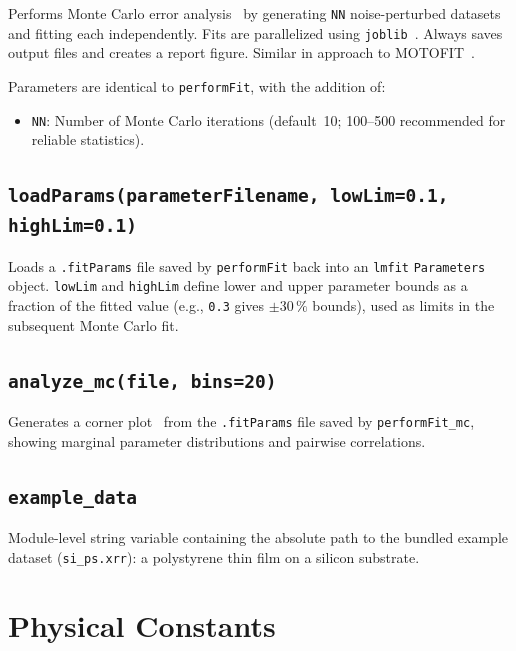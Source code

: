 \documentclass[11pt,a4paper]{article}
\begin{document}
Performs Monte Carlo error analysis~\cite{Heinrich2009} by generating \texttt{NN}
noise-perturbed datasets and fitting each independently. Fits are parallelized using
\texttt{joblib}~\cite{joblib}. Always saves output files and creates a report figure.
Similar in approach to MOTOFIT~\cite{Nelson2006}.

Parameters are identical to \texttt{performFit}, with the addition of:
\begin{itemize}[leftmargin=1.5em]
  \item \texttt{NN}: Number of Monte Carlo iterations (default~10;
        100--500 recommended for reliable statistics).
\end{itemize}

\subsection*{\texttt{loadParams(parameterFilename, lowLim=0.1, highLim=0.1)}}

Loads a \texttt{.fitParams} file saved by \texttt{performFit} back into an \texttt{lmfit}
\texttt{Parameters} object. \texttt{lowLim} and \texttt{highLim} define lower and upper
parameter bounds as a fraction of the fitted value (e.g., \texttt{0.3} gives $\pm30\,\%$
bounds), used as limits in the subsequent Monte Carlo fit.

\subsection*{\texttt{analyze\_mc(file, bins=20)}}

Generates a corner plot~\cite{ForemanMackey2016} from the \texttt{.fitParams} file saved
by \texttt{performFit\_mc}, showing marginal parameter distributions and pairwise correlations.

\subsection*{\texttt{example\_data}}

Module-level string variable containing the absolute path to the bundled example dataset
(\texttt{si\_ps.xrr}): a polystyrene thin film on a silicon substrate.

\section{Physical Constants}
\end{document}
